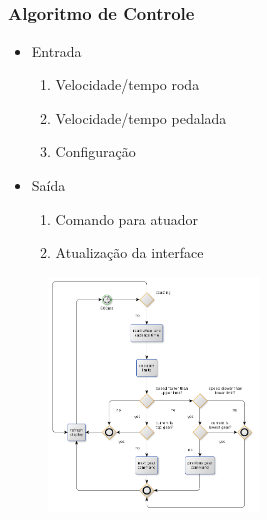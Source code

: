 \documentclass{beamer}
\begin{document}
\subsection{}
\begin{frame}
 \frametitle{Algoritmo de Controle}
  \begin{itemize}
    \item Entrada
    \begin{enumerate}
     \item Velocidade/tempo roda
      \item Velocidade/tempo pedalada
      \item Configuração
    \end{enumerate}
    \item Saída
     \begin{enumerate}
      \item Comando para atuador
      \item Atualização da interface
     \end{enumerate}

  \end{itemize}

\end{frame}

\begin{frame}[plain]
  \begin{figure}
    \begin{center}
      \includegraphics[width=2.2in]{fluxograma1}
    \end{center}
  \end{figure}
\end{frame}
\end{document}
